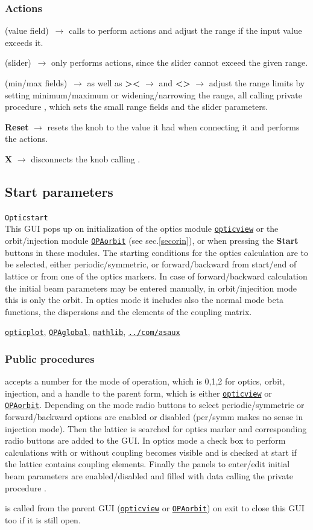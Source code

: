 \documentclass[12pt]{article}
\newcommand\code[1]{{\tt #1}}
\newcommand{\ofld}[1]{\colorbox{black!15}{{\bf #1}}}
\newcommand{\ofldx}[1]{\colorbox{black!15}{(#1)}}
\newcommand\guico[1]{{\color{blue}\code{#1}}}
\newcommand\guifco[1]{{\color{violet}\code{#1}}}
\newcommand{\evcodf}[2]{\ofld{#1} $\rightarrow$ \guifco{#2}}
\newcommand{\evcodxf}[2]{\ofldx{#1}~$\rightarrow$ \guifco{#2}}
\newcommand{\opagui}[1]{\colorbox{blue!20}{\code{#1}}}
\newcommand{\oguih}[2]{\subsection{\label{#2}#1}{\Huge\opagui{#2}}\\}
\newcommand{\ogui}[1]{\hyperref[#1]{\opagui{#1}}}
\newcommand{\opauni}[1]{\colorbox{orange!30}{\code{#1}}}
\newcommand{\ouni}[1]{\hyperref[#1]{\opauni{#1}}}
\newcommand{\uses}[1]{\flushleft {\bf Uses:} #1}
\newcommand{\desc}[1]{#1}
\newcommand{\act}[1]{\subsubsection*{Actions} #1}
\newcommand{\ppro}[1]{\subsubsection*{Public procedures} #1}
\begin{document}
\act{
\evcodxf{value field}{editKKeyPress} calls \guifco{KUpdate} to perform actions and adjust the range if the input value exceeds it.

\evcodxf{slider}{sliderScroll} only performs actions, since the slider cannot exceed the given range.

\evcodxf{min/max fields}{editmin/maxKeyPress} as well as \evcodf{\textgreater\textless}{butwidClick} and \evcodf{\textless\textgreater}{butnarClick} adjust the range limits by setting minimum/maximum or widening/narrowing the range, all calling private procedure \guifco{SetKrange}, which sets the small range fields and the slider parameters.

\evcodf{Reset}{butresClick} resets the knob to the value it had when connecting it and performs the actions.

\evcodf{X}{butfreeClick} disconnects the knob calling \guifco{Unload}.
}

\oguih{Start parameters}{Opticstart} 

\desc{This GUI pops up on initialization of the optics module  \ogui{opticview} or the orbit/injection module \ogui{OPAorbit} (see sec.\ref{secorin}), or when pressing the \ofld{Start} buttons in these modules. The starting conditions for the optics calculation are to be selected, either periodic/symmetric, or forward/backward from start/end of lattice or from one of the optics markers. In case of forward/backward calculation the initial beam parameters may be entered manually, in orbit/injecition mode this is only the orbit. In optics mode it includes also the normal mode beta functions, the dispersions and the elements of the coupling matrix.}

\uses{\ouni{opticplot}, \ouni{OPAglobal}, \ouni{mathlib}, \ouni{../com/asaux}} 

\ppro{
\guico{Load} accepts a number for the mode of operation, which is 0,1,2 for optics, orbit, injection, and a handle to the parent form, which is either \ogui{opticview} or \ogui{OPAorbit}. Depending on the mode radio buttons to select periodic/symmetric or forward/backward options are enabled or disabled (per/symm makes no sense in injection mode). Then the lattice is searched for optics marker and corresponding radio buttons are added to the GUI. In optics mode a check box to perform calculations with or without coupling becomes visible and is checked at start if the lattice contains coupling elements. Finally the panels to enter/edit initial beam parameters are enabled/disabled and filled with data calling the private procedure \guico{set\_pan\_ini}.

\guico{Exit} is called from the parent GUI (\ogui{opticview} or \ogui{OPAorbit}) on exit to close this GUI too if it is still open.
}
\end{document}
